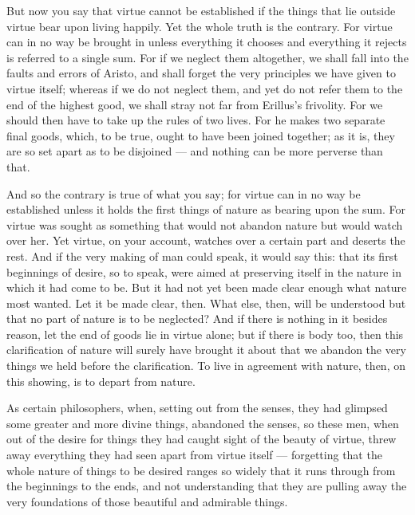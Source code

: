 But now you say that virtue cannot be established if the things that lie outside virtue bear upon living happily. Yet the whole truth is the contrary. For virtue can in no way be brought in unless everything it chooses and everything it rejects is referred to a single sum. For if we neglect them altogether, we shall fall into the faults and errors of Aristo, and shall forget the very principles we have given to virtue itself; whereas if we do not neglect them, and yet do not refer them to the end of the highest good, we shall stray not far from Erillus's frivolity. For we should then have to take up the rules of two lives. For he makes two separate final goods, which, to be true, ought to have been joined together; as it is, they are so set apart as to be disjoined — and nothing can be more perverse than that.

 And so the contrary is true of what you say; for virtue can in no way be established unless it holds the first things of nature as bearing upon the sum. For virtue was sought as something that would not abandon nature but would watch over her. Yet virtue, on your account, watches over a certain part and deserts the rest. And if the very making of man could speak, it would say this: that its first beginnings of desire, so to speak, were aimed at preserving itself in the nature in which it had come to be. But it had not yet been made clear enough what nature most wanted. Let it be made clear, then. What else, then, will be understood but that no part of nature is to be neglected? And if there is nothing in it besides reason, let the end of goods lie in virtue alone; but if there is body too, then this clarification of nature will surely have brought it about that we abandon the very things we held before the clarification. To live in agreement with nature, then, on this showing, is to depart from nature.

 As certain philosophers, when, setting out from the senses, they had glimpsed some greater and more divine things, abandoned the senses, so these men, when out of the desire for things they had caught sight of the beauty of virtue, threw away everything they had seen apart from virtue itself — forgetting that the whole nature of things to be desired ranges so widely that it runs through from the beginnings to the ends, and not understanding that they are pulling away the very foundations of those beautiful and admirable things.

